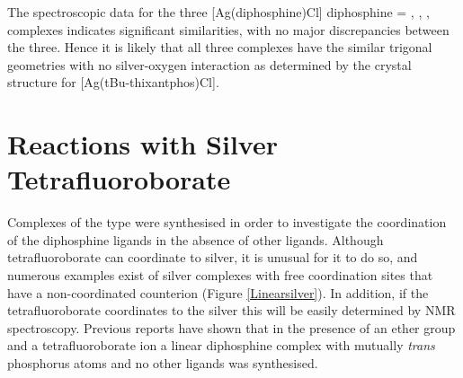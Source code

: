 
The spectroscopic data for the three [Ag(diphosphine)Cl] diphosphine = \tBuxantphos, \tButhixantphos, \tBusixantphos, complexes indicates significant similarities, with no major discrepancies between the three.  Hence it is likely that all three complexes have the similar trigonal geometries with no silver-oxygen interaction as determined by the crystal structure for [Ag(tBu-thixantphos)Cl].

\section{Reactions with Silver Tetrafluoroborate}

Complexes of the type  were synthesised in order to investigate the coordination of the diphosphine ligands in the absence of other ligands.  Although tetrafluoroborate can coordinate to silver, it is unusual for it to do so,  and numerous examples exist of silver complexes with free coordination sites that have a non-coordinated  counterion (Figure \ref{Linearsilver}).  In addition, if the tetrafluoroborate coordinates to the silver this will be easily determined by \fluorine{} NMR spectroscopy.  Previous reports have shown that in the presence of an ether group and a tetrafluoroborate ion a linear diphosphine complex with mutually \emph{trans} phosphorus atoms and no other ligands was synthesised.  

